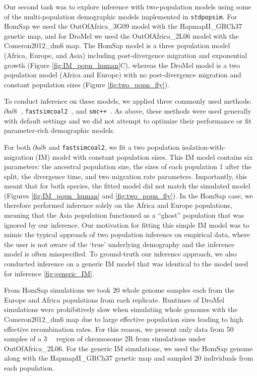 \documentclass[12pt,halfline,a4paper]{ouparticle}
\newcommand{\stdpopsim}{\texttt{stdpopsim}\xspace}
\newcommand{\dadi}{$\partial a \partial i$\xspace}
\newcommand{\smcpp}{\texttt{smc++}\xspace}
\newcommand{\fastsimcoal}{\texttt{fastsimcoal2}\xspace}
\begin{document}
Our second task was to explore inference with two-population models
using some of the multi-population demographic models implemented in \stdpopsim.
For HomSap we used the OutOfAfrica\_3G09 model with the HapmapII\_GRCh37 genetic map,
and for DroMel we used the OutOfAfrica\_2L06 model with the Comeron2012\_dm6 map.
The HomSap model is a three population model (Africa, Europe, and Asia) including post-divergence
migration and exponential growth (Figure \ref{fig:IM_popn_human}C), whereas the
DroMel model is a two population model (Africa and Europe) with no post-divergence
migration and constant population sizes (Figure \ref{fig:two_popn_fly}).

To conduct inference on these models, we applied three commonly used methods:
\dadi~\citep{gutenkunst2009inferring}, \fastsimcoal~\citep{excoffier2013robust},
and \smcpp~\citep{terhorst2017robust}. As above, these methods were used
generally with default settings and we did not attempt to optimize their performance or fit
parameter-rich demographic models.

For both \dadi and \fastsimcoal, we fit a two population
isolation-with-migration (IM) model with constant population sizes.
This IM model contains six parameters:
the ancestral population size, the sizes of each population 1 after the split,
the divergence time, and two migration rate parameters.
Importantly, this meant that for both species, the
fitted model did not match the simulated model (Figures \ref{fig:IM_popn_human} and \ref{fig:two_popn_fly}).
In the HomSap case, we therefore performed inference solely on the Africa
and Europe populations, meaning that the Asia population functioned as a ``ghost''
population that was ignored by our inference. Our motivation for fitting this simple
IM model was to mimic the typical approach of two population inference on empirical
data, where the user is not aware of the `true' underlying demography and the inference
model is often misspecified. To ground-truth our inference approach, we also conducted
inference on a generic IM model that was identical to the model used for inference \ref{fig:generic_IM}.

From HomSap simulations we took 20 whole genome samples each from the Europe and Africa populations
from each replicate.
Runtimes of DroMel simulations were prohibitively slow when simulating whole genomes
with the Comeron2012\_dm6 map due to large effective population sizes leading to
high effective recombination rates. For this reason, we present only data
from 50 samples of a \SI{3}{\mega\byte} region of chromosome 2R from simulations under OutOfAfrica\_2L06.
For the generic IM simulations, we used the HomSap genome along with the
HapmapII\_GRCh37 genetic map and sampled 20 individuals from each population.
\end{document}
